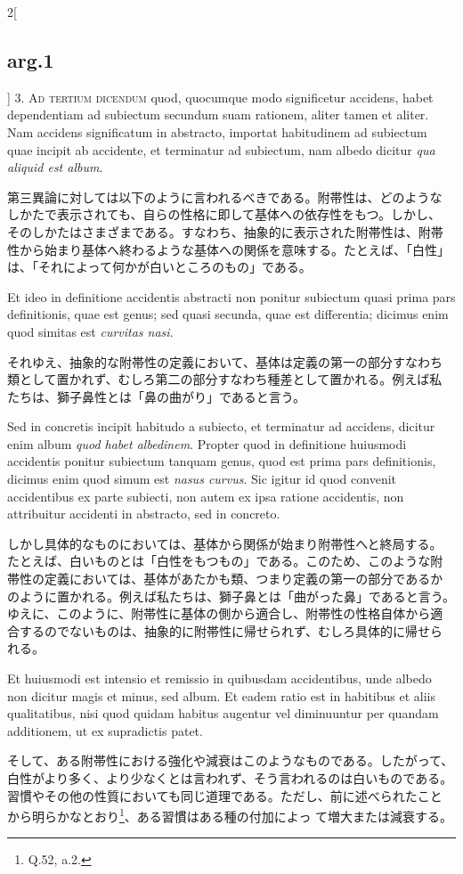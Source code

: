\documentclass[paper=a4paper,fontsize=10pt,jafontsize=9pt,titlepage]{jlreq}
\begin{document}
\begin{paracol}{2}[\subsection{arg.1}]
3. {\scshape Ad tertium dicendum} quod, quocumque modo significetur
accidens, habet dependentiam ad subiectum secundum suam rationem,
aliter tamen et aliter. Nam accidens significatum in abstracto,
importat habitudinem ad subiectum quae incipit ab accidente, et
terminatur ad subiectum, nam albedo dicitur {\itshape qua aliquid est
album}.

\switchcolumn

第三異論に対しては以下のように言われるべきである。附帯性は、どのような
しかたで表示されても、自らの性格に即して基体への依存性をもつ。しかし、
そのしかたはさまざまである。すなわち、抽象的に表示された附帯性は、附帯
性から始まり基体へ終わるような基体への関係を意味する。たとえば、「白性」
は、「それによって何かが白いところのもの」である。

\switchcolumn*

Et ideo in definitione accidentis abstracti non ponitur subiectum
quasi prima pars definitionis, quae est genus; sed quasi secunda, quae
est differentia; dicimus enim quod simitas est {\itshape curvitas
nasi}.

\switchcolumn

それゆえ、抽象的な附帯性の定義において、基体は定義の第一の部分すなわち
類として置かれず、むしろ第二の部分すなわち種差として置かれる。例えば私
たちは、獅子鼻性とは「鼻の曲がり」であると言う。

\switchcolumn*

Sed in concretis incipit habitudo a subiecto, et terminatur ad
accidens, dicitur enim album {\itshape quod habet albedinem}.  Propter
quod in definitione huiusmodi accidentis ponitur subiectum tanquam
genus, quod est prima pars definitionis, dicimus enim quod simum est
{\itshape nasus curvus}. Sic igitur id quod convenit accidentibus ex
parte subiecti, non autem ex ipsa ratione accidentis, non attribuitur
accidenti in abstracto, sed in concreto.

\switchcolumn

しかし具体的なものにおいては、基体から関係が始まり附帯性へと終局する。
たとえば、白いものとは「白性をもつもの」である。このため、このような附
帯性の定義においては、基体があたかも類、つまり定義の第一の部分であるか
のように置かれる。例えば私たちは、獅子鼻とは「曲がった鼻」であると言う。
ゆえに、このように、附帯性に基体の側から適合し、附帯性の性格自体から適
合するのでないものは、抽象的に附帯性に帰せられず、むしろ具体的に帰せら
れる。

\switchcolumn*

Et huiusmodi est intensio et remissio in quibusdam accidentibus, unde
albedo non dicitur magis et minus, sed album. Et eadem ratio est in
habitibus et aliis qualitatibus, nisi quod quidam habitus augentur vel
diminuuntur per quandam additionem, ut ex supradictis patet.

\switchcolumn

そして、ある附帯性における強化や減衰はこのようなものである。したがって、
白性がより多く、より少なくとは言われず、そう言われるのは白いものである。
習慣やその他の性質においても同じ道理である。ただし、前に述べられたこと
から明らかなとおり\footnote{Q.52, a.2.}、ある習慣はある種の付加によっ
て増大または減衰する。

\end{paracol}
\end{document}
